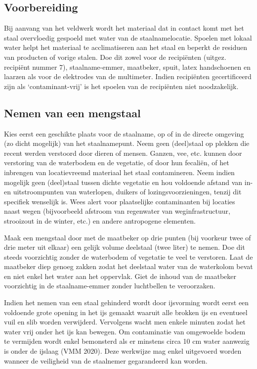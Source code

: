 \documentclass[
]{scrreprt}
\begin{document}
\subsection{\texorpdfstring{\textbf{Voorbereiding}}{Voorbereiding}}\label{voorbereiding}

Bij aanvang van het veldwerk wordt het materiaal dat in contact komt met het staal overvloedig gespoeld met water van de staalnamelocatie. Spoelen met lokaal water helpt het materiaal te acclimatiseren aan het staal en beperkt de residuen van producten of vorige stalen. Doe dit zowel voor de recipiënten (uitgez. recipiënt nummer 7), staalname-emmer, maatbeker, spuit, latex handschoenen en laarzen als voor de elektrodes van de multimeter. Indien recipiënten gecertificeerd zijn als `contaminant-vrij' is het spoelen van de recipiënten niet noodzakelijk.

\subsection{\texorpdfstring{\textbf{Nemen van een mengstaal}}{Nemen van een mengstaal}}\label{nemen-van-een-mengstaal}

Kies eerst een geschikte plaats voor de staalname, op of in de directe omgeving (zo dicht mogelijk) van het staalnamepunt. Neem geen (deel)staal op plekken die recent werden verstoord door dieren of mensen. Ganzen, vee, etc. kunnen door verstoring van de waterbodem en de vegetatie, of door hun fecaliën, of het inbrengen van locatievreemd materiaal het staal contamineren. Neem indien mogelijk geen (deel)staal tussen dichte vegetatie en hou voldoende afstand van in- en uitstroompunten van waterlopen, duikers of lozingsvoorzieningen, tenzij dit specifiek wenselijk is. Wees alert voor plaatselijke contaminanten bij locaties naast wegen (bijvoorbeeld afstroom van regenwater van weginfrastructuur, strooizout in de winter, etc.) en andere antropogene elementen.

Maak een mengstaal door met de maatbeker op drie punten (bij voorkeur twee of drie meter uit elkaar) een gelijk volume deelstaal (twee liter) te nemen. Doe dit steeds voorzichtig zonder de waterbodem of vegetatie te veel te verstoren. Laat de maatbeker diep genoeg zakken zodat het deelstaal water van de waterkolom bevat en niet enkel het water aan het oppervlak. Giet de inhoud van de maatbeker voorzichtig in de staalname-emmer zonder luchtbellen te veroorzaken.

Indien het nemen van een staal gehinderd wordt door ijsvorming wordt eerst een voldoende grote opening in het ijs gemaakt waaruit alle brokken ijs en eventueel vuil en slib worden verwijderd. Vervolgens wacht men enkele minuten zodat het water vrij onder het ijs kan bewegen. Om contaminatie van omgewoelde bodem te vermijden wordt enkel bemonsterd als er minstens circa 10 cm water aanwezig is onder de ijslaag (VMM 2020). Deze werkwijze mag enkel uitgevoerd worden wanneer de veiligheid van de staalnemer gegarandeerd kan worden.
\end{document}

